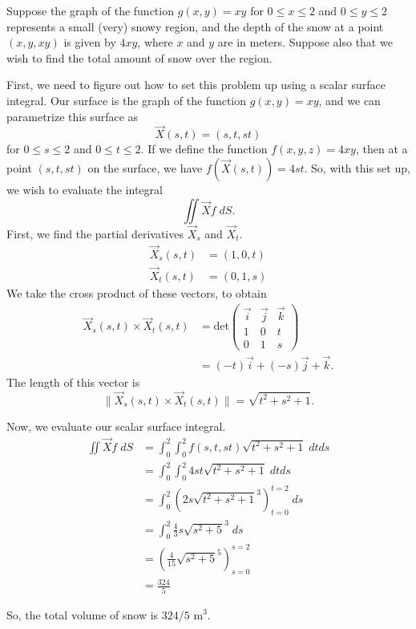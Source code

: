 \documentclass{ximera}
\begin{document}
\begin{example}
Suppose the graph of the function $g(x,y) = xy$ for $0\leq x\leq 2$ and $0\leq y\leq 2$ represents a small (very) snowy region, and the depth of the snow at a point $(x,y,xy)$ is given by $4xy$, where $x$ and $y$ are in meters. Suppose also that we wish to find the total amount of snow over the region.

First, we need to figure out how to set this problem up using a scalar surface integral. Our surface is the graph of the function $g(x,y) = xy$, and we can parametrize this surface as
\[
\vec{X}(s,t) = (s,t,st)
\]
for $0\leq s\leq 2$ and $0\leq t\leq 2$. If we define the function $f(x,y,z)=4xy$, then at a point $(s,t,st)$ on the surface, we have $f(\vec{X}(s,t)) = 4st$. So, with this set up, we wish to evaluate the integral
\[
\iint{\vec{X}}f\;dS.
\]
First, we find the partial derivatives $\vec{X}_s$ and $\vec{X}_t$.
\begin{align*}
\vec{X}_s(s,t) &= (1, 0, t)\\
\vec{X}_t(s,t) &= (0,1,s)
\end{align*}
We take the cross product of these vectors, to obtain
\begin{align*}
\vec{X}_s(s,t)\times\vec{X}_t(s,t) &= \text{det}\begin{pmatrix}
\vec{i} & \vec{j} & \vec{k}\\
1 & 0 & t\\
0 & 1 & s
\end{pmatrix}\\
&= (-t)\vec{i} + (-s)\vec{j} + \vec{k}.
\end{align*}
The length of this vector is
\[
\|\vec{X}_s(s,t)\times\vec{X}_t(s,t)\| = \sqrt{t^2+s^2+1}.
\]
\end{example}
Now, we evaluate our scalar surface integral.
\begin{align*}
\iint{\vec{X}}f\;dS &= \int_0^2\int_0^2 f(s,t,st)\sqrt{t^2+s^2+1}\; dtds\\
&= \int_0^2\int_0^2 4st\sqrt{t^2+s^2+1}\; dtds\\
&= \int_0^2\left(2s\sqrt{t^2+s^2+1}^3\right)_{t = 0}^{t = 2}\;ds\\
&= \int_0^2 \frac{4}{3}s\sqrt{s^2 + 5}^3\;ds\\
&= \left(\frac{4}{15}\sqrt{s^2+5}^5\right)_{s = 0}^{s = 2}\\
&= \frac{324}{5}
\end{align*}

So, the total volume of snow is $324/5\text{ m}^3$.
\end{document}

